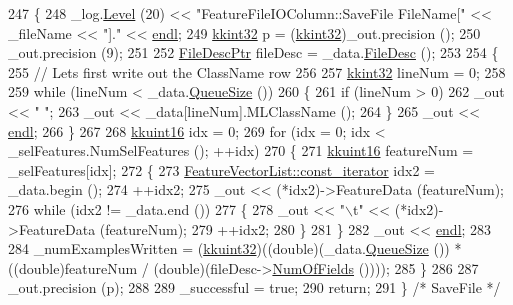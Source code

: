 \begin{DoxyCode}
247 \{
248   \_log.\hyperlink{class_k_k_b_1_1_run_log_a32cf761d7f2e747465fd80533fdbb659}{Level} (20) << \textcolor{stringliteral}{"FeatureFileIOColumn::SaveFile     FileName["} << \_fileName << \textcolor{stringliteral}{"]."} << 
      \hyperlink{namespace_k_k_b_ad1f50f65af6adc8fa9e6f62d007818a8}{endl};
249   \hyperlink{namespace_k_k_b_a8fa4952cc84fda1de4bec1fbdd8d5b1b}{kkint32}  p = (\hyperlink{namespace_k_k_b_a8fa4952cc84fda1de4bec1fbdd8d5b1b}{kkint32})\_out.precision ();
250   \_out.precision (9);
251 
252   \hyperlink{class_k_k_m_l_l_1_1_file_desc}{FileDescPtr}  fileDesc = \_data.\hyperlink{class_k_k_m_l_l_1_1_feature_vector_list_a736923be9c4ac7553a5aa87dd24efd16}{FileDesc} ();
253 
254   \{
255     \textcolor{comment}{// Lets first write out the ClassName row}
256 
257     \hyperlink{namespace_k_k_b_a8fa4952cc84fda1de4bec1fbdd8d5b1b}{kkint32}  lineNum = 0;
258 
259     \textcolor{keywordflow}{while}  (lineNum < \_data.\hyperlink{class_k_k_b_1_1_k_k_queue_a1dab601f75ee6a65d97f02bddf71c40d}{QueueSize} ())
260     \{
261       \textcolor{keywordflow}{if}  (lineNum > 0)
262         \_out << \textcolor{stringliteral}{" "};
263       \_out << \_data[lineNum].MLClassName ();
264     \}
265     \_out << \hyperlink{namespace_k_k_b_ad1f50f65af6adc8fa9e6f62d007818a8}{endl};
266   \}
267 
268   \hyperlink{namespace_k_k_b_aa8c7d4d30381c8a0b6fce68974a9c8a9}{kkuint16}  idx = 0;
269   \textcolor{keywordflow}{for}  (idx = 0;  idx < \_selFeatures.NumSelFeatures ();  ++idx)
270   \{
271     \hyperlink{namespace_k_k_b_aa8c7d4d30381c8a0b6fce68974a9c8a9}{kkuint16}  featureNum = \_selFeatures[idx];
272     \{
273       \hyperlink{class_k_k_b_1_1_k_k_queue_aeb057c9c010446f46f57c1e355f981f1}{FeatureVectorList::const\_iterator}  idx2 = \_data.begin ();
274       ++idx2;
275       \_out  << (*idx2)->FeatureData (featureNum);
276       \textcolor{keywordflow}{while}  (idx2 != \_data.end ())
277       \{
278         \_out  << \textcolor{stringliteral}{"\(\backslash\)t"} << (*idx2)->FeatureData (featureNum);
279         ++idx2;
280       \}
281     \}
282     \_out << \hyperlink{namespace_k_k_b_ad1f50f65af6adc8fa9e6f62d007818a8}{endl};
283 
284     \_numExamplesWritten = (\hyperlink{namespace_k_k_b_af8d832f05c54994a1cce25bd5743e19a}{kkuint32})((\textcolor{keywordtype}{double})(\_data.\hyperlink{class_k_k_b_1_1_k_k_queue_a1dab601f75ee6a65d97f02bddf71c40d}{QueueSize} ()) * ((\textcolor{keywordtype}{double})featureNum / 
      (double)(fileDesc->\hyperlink{class_k_k_m_l_l_1_1_file_desc_a07abdfb77949dee565c555c7651581c2}{NumOfFields} ())));
285   \}
286 
287   \_out.precision (p);
288 
289   \_successful = \textcolor{keyword}{true};
290   \textcolor{keywordflow}{return};
291 \}  \textcolor{comment}{/* SaveFile */}
\end{DoxyCode}


